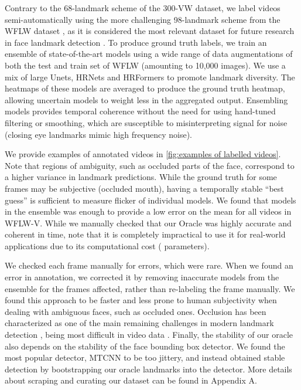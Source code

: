 \documentclass[10pt,twocolumn,letterpaper]{article}
\begin{document}
Contrary to the 68-landmark scheme of the 300-VW dataset, we label videos semi-automatically using the more challenging 98-landmark scheme from the WFLW dataset \cite{Wayne2018LookAtBoundary}, as it is considered the most relevant dataset for future research in face landmark detection \cite{Khabarlak2022FastFacialLandmarkDetectionSurvey1}. To produce ground truth labels, we train an ensemble of  state-of-the-art models using a wide range of data augmentations of both the test and train set of WFLW (amounting to 10,000 images). We use a mix of large Unets, HRNets \cite{Sun2019HRNet} and HRFormers \cite{Yuan2021HRFormer} to promote landmark diversity. The heatmaps of these models are averaged to produce the ground truth heatmap, allowing uncertain models to weight less in the aggregated output. Ensembling models provides temporal coherence without the need for using hand-tuned filtering or smoothing, which are susceptible to misinterpreting signal for noise (\eg closing eye landmarks mimic high frequency noise). 

We provide examples of annotated videos in \cref{fig:examples of labelled videos}. Note that regions of ambiguity, such as occluded parts of the face, correspond to a higher variance in landmark predictions. While the ground truth for some frames may be subjective (\eg occluded mouth), having a temporally stable ``best guess'' is sufficient to measure flicker of individual models. We found that  models in the ensemble was enough to provide a low error on the mean for all videos in WFLW-V. While we manually checked that our Oracle was highly accurate and coherent in time, note that it is completely impractical to use it for real-world applications due to its computational cost ( parameters). 

We checked each frame manually for errors, which were rare. When we found an error in annotation, we corrected it by removing inaccurate models from the ensemble for the frames affected, rather than re-labeling the frame manually. We found this approach to be faster and less prone to human subjectivity when dealing with ambiguous faces, such as occluded ones. Occlusion has been characterized as one of the main remaining challenges in modern landmark detection \cite{Wu2019FacialLandmarkDetectionSurvey2}, being most difficult in video data \cite{Shen2015FirstFacialLandmarkTracking}. Finally, the stability of our oracle also depends on the stability of the face bounding box detector. We found the most popular detector, MTCNN \cite{Zhang2017MTCNN} to be too jittery, and instead obtained stable detection by bootstrapping our oracle landmarks into the detector. More details about scraping and curating our dataset can be found in Appendix A.
\end{document}
